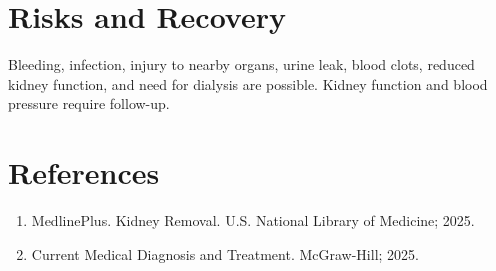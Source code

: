\section*{Risks and Recovery}
Bleeding, infection, injury to nearby organs, urine leak, blood clots, reduced kidney function, and need for dialysis are possible. Kidney function and blood pressure require follow-up.
\section*{References}
\begin{enumerate}\item MedlinePlus. Kidney Removal. U.S. National Library of Medicine; 2025.\item Current Medical Diagnosis and Treatment. McGraw-Hill; 2025.\end{enumerate}
\clearpage
